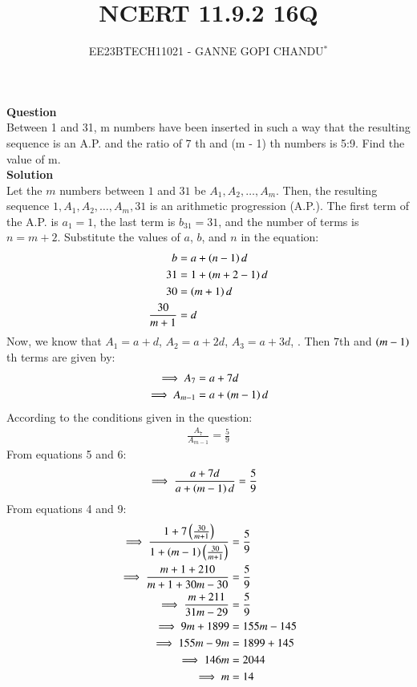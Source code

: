 \documentclass[journal,12pt,twocolumn]{IEEEtran}
\theoremstyle{remark}
\begin{document}

\vspace{3cm}
\title{NCERT 11.9.2 16Q}
\author{EE23BTECH11021 - GANNE GOPI CHANDU$^{*}$%
}
\maketitle
\newpage
\bigskip
\renewcommand{\thefigure}{\theenumi}
\renewcommand{\thetable}{\theenumi}

\textbf{Question}\\
Between 1 and 31, m numbers have been inserted in such a way that the resulting sequence is an A.P. and 
the ratio of 7
th and (m - 1)
th numbers is 5:9. Find the value of m.\\
\textbf{Solution}\\
Let the $m$ numbers between $1$ and $31$ be $A_1, A_2, \ldots, A_{m}$. Then, the resulting sequence $1, A_1, A_2, \ldots, A_{m}, 31$ is an arithmetic progression (A.P.).
The first term of the A.P. is $a_1 = 1$, the last term is $b_{31} = 31$, and the number of terms is $n = m + 2$. 
Substitute the values of $a$, $b$, and $n$ in the equation:
\begin{align}
 b &= a + \left(n-1\right)d \\
31 &= 1 + \left(m + 2 - 1\right)d \\
30 &= \left(m + 1\right)d \\
\frac{30}{m + 1} &= d 
\end{align}
Now, we know that $A_1 = a + d$, $A_2 = a + 2d$, $A_3 = a + 3d$, . Then $7$th and $\left(m-1\right)$th terms are given by:
\begin{align}
\implies A_{7} &= a + 7d   \\ 
\implies A_{m-1} &= a + \left(m-1\right)d  
\end{align}
According to the conditions given in the question:
\begin{align}
\frac{A_{7}}{A_{m-1}} = \frac{5}{9} 
\end{align}
From equations 5 and 6:
\begin{align}
\implies \frac{a + 7d}{a + \left(m-1\right)d} &= \frac{5}{9} 
\end{align}
From equations 4 and 9:
\begin{align}
\implies \frac{1+7\left({\frac{30}{m+1}}\right)}{1+\left({m-1}\right)\left(\frac{30}{m+1}\right)} &= \frac{5}{9} \\
\implies \frac{m+1+210}{m+1+30m-30} &= \frac{5}{9}\\
\implies \frac{m+211}{31m-29} &= \frac{5}{9}\\
\implies 9m+1899 &=155m-145\\
\implies 155m-9m &=1899+145\\
\implies 146m &=2044\\
\implies m &=14
\end{align}
\end{document}
